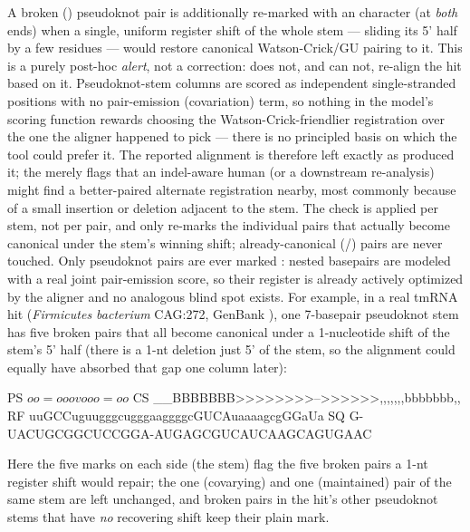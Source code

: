 A broken () pseudoknot pair is additionally re-marked with an
 character (at \emph{both} ends) when a single, uniform register
shift of the whole stem --- sliding its 5' half by a few residues ---
would restore canonical Watson-Crick/GU pairing to it. This is a purely
post-hoc \emph{alert}, not a correction:  does not, and can
not, re-align the hit based on it. Pseudoknot-stem columns are scored as
independent single-stranded positions with no pair-emission (covariation)
term, so nothing in the model's scoring function rewards choosing the
Watson-Crick-friendlier registration over the one the aligner happened to
pick --- there is no principled basis on which the tool could prefer it. The
reported alignment is therefore left exactly as  produced it;
the  merely flags that an indel-aware human (or a downstream
re-analysis) might find a better-paired alternate registration nearby, most
commonly because of a small insertion or deletion adjacent to the stem. The
check is applied per stem, not per pair, and only re-marks the individual
 pairs that actually become canonical under the stem's winning
shift; already-canonical (\otext{=}/\otext{\$}) pairs are never touched. Only
pseudoknot pairs are ever marked : nested basepairs are modeled with
a real joint pair-emission score, so their register is already actively
optimized by the aligner and no analogous blind spot exists. For example, in
a real tmRNA hit (\emph{Firmicutes bacterium} CAG:272, GenBank
), one 7-basepair pseudoknot stem has five broken pairs
that all become canonical under a 1-nucleotide shift of the stem's 5' half
(there is a 1-nt deletion just 5' of the stem, so the alignment could equally
have absorbed that gap one column later):
\begin{sreoutput}
     PS    $oo=ooov                      ooo=oo$
     CS  __BBBBBBB>>>>>>>>-->>>>>>,,,,,,,bbbbbbb,,
     RF  uuGCCuguugggcugggaaggggcGUCAuaaaagcgGGaUa
     SQ  G-UACUGCGGCUCCGGA-AUGAGCGUCAUCAAGCAGUGAAC
\end{sreoutput}
Here the five  marks on each side (the  stem) flag the
five broken pairs a 1-nt register shift would repair; the one \otext{\$}
(covarying) and one \otext{=} (maintained) pair of the same stem are left
unchanged, and broken pairs in the hit's other pseudoknot stems that have
\emph{no} recovering shift keep their plain  mark.

